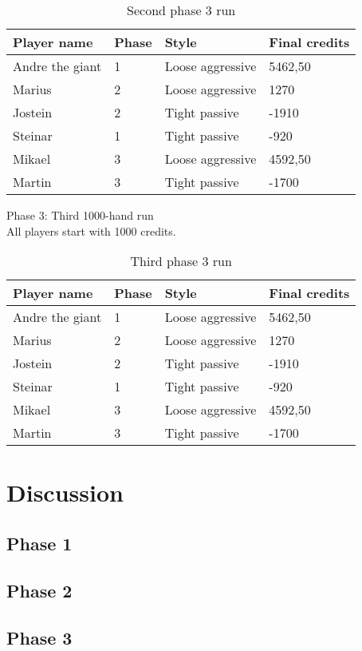 \documentclass[a4paper, 12pt]{article}
\begin{document}
\begin{table}[H]
	\begin{center}
		\begin{tabular}{|l|l|l| p{6cm} |}
		\hline
		\textbf{Player name} & \textbf{Phase} & \textbf{Style} & \textbf{Final credits} \\
		\hline
		Andre the giant & 1 & Loose aggressive & 5462,50 \\
		\hline
		Marius & 2 & Loose aggressive & 1270 \\
		\hline
		Jostein & 2 & Tight passive & -1910 \\
		\hline
		Steinar & 1 & Tight passive & -920 \\
		\hline
		Mikael & 3 & Loose aggressive & 4592,50 \\
		\hline
		Martin & 3 & Tight passive & -1700 \\
		\hline
		\end{tabular}
	\end{center}
	\caption{Second phase 3 run}
\end{table}

\begin{center}
	{ \Large Phase 3: Third 1000-hand run } \\
	All players start with 1000 credits.
\end{center}

\begin{table}[H]
	\begin{center}
		\begin{tabular}{|l|l|l| p{6cm} |}
		\hline
		\textbf{Player name} & \textbf{Phase} & \textbf{Style} & \textbf{Final credits} \\
		\hline
		Andre the giant & 1 & Loose aggressive & 5462,50 \\
		\hline
		Marius & 2 & Loose aggressive & 1270 \\
		\hline
		Jostein & 2 & Tight passive & -1910 \\
		\hline
		Steinar & 1 & Tight passive & -920 \\
		\hline
		Mikael & 3 & Loose aggressive & 4592,50 \\
		\hline
		Martin & 3 & Tight passive & -1700 \\
		\hline
		\end{tabular}
	\end{center}
	\caption{Third phase 3 run}
\end{table}

\section{Discussion}

\subsection{Phase 1}

\subsection{Phase 2}

\subsection{Phase 3}
\end{document}
